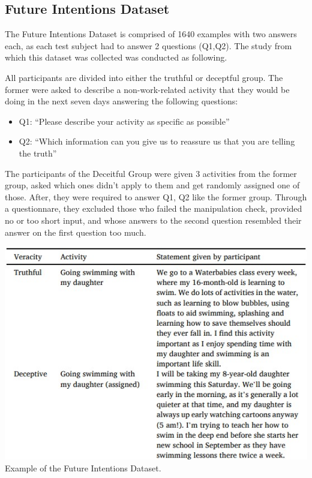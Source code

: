 \documentclass[10pt,twocolumn,letterpaper]{article}
\begin{document}
\subsection{Future Intentions Dataset}

The Future Intentions Dataset is comprised of 1640 examples with two answers each, as each test subject had to answer 2 questions (Q1,Q2).
The study \cite{Kleinberg} from which this dataset was collected was conducted as following.

All participants are divided into either the truthful or deceptful group.
The former were asked to describe a non-work-related activity that they would be doing in the next seven days answering the following questions:

\begin{itemize}
    \item Q1: “Please describe your activity as specific as possible”
    \item Q2: “Which information can you give us to reassure us that you are telling the truth”
\end{itemize}

The participants of the Deceitful Group were given 3 activities from the former group, asked which ones didn’t apply 
to them and get randomly assigned one of those. After, they were required to answer Q1, Q2 like the former group.
Through a questionnare, they excluded those who failed the manipulation
check, provided no or too short input, and whose answers to the second question resembled their
answer on the first question too much. \\

\begin{center}
    \includegraphics[scale=0.65]{img/future_intentions_dataset.jpg} \\
    \small {Example of the Future Intentions Dataset.} \\
\end{center} 
\end{document}
